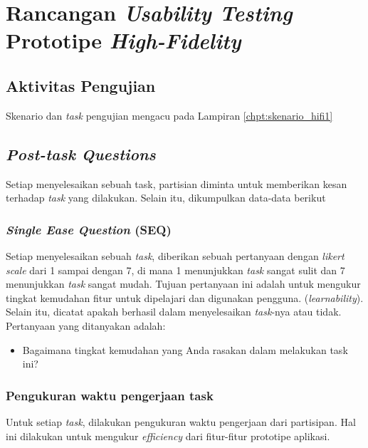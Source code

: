 \chapter{Rancangan \textit{Usability Testing} Prototipe \textit{High-Fidelity}}
\label{chpt:testing_hifi}

\newlength{\coln}
\setlength{\coln}{0.02\textwidth}

\newcommand{\apghead}[1]{\cellcolor[HTML]{A3E5F5}\textbf{#1}}
\newcommand{\apgheadcell}[1]{\multicolumn{1}{c|}{\apghead{#1}}}

\newcommand{\borderblue}{\arrayrulecolor[HTML]{A3E5F5}}
\newcommand{\borderblack}{\arrayrulecolor{black}}


\large \section{Aktivitas Pengujian}
\normalsize
Skenario dan \textit{task} pengujian mengacu pada Lampiran \ref{chpt:skenario_hifi1}

\large \section{\textit{Post-task Questions}}
\normalsize

Setiap menyelesaikan sebuah task, partisian diminta untuk memberikan kesan terhadap \textit{task} yang dilakukan. Selain itu, dikumpulkan data-data berikut

\subsection{\textit{Single Ease Question} (SEQ)}

Setiap menyelesaikan sebuah \textit{task}, diberikan sebuah pertanyaan dengan \textit{likert scale} dari 1 sampai dengan 7, di mana 1 menunjukkan \textit{task} sangat sulit dan 7 menunjukkan \textit{task} sangat mudah. Tujuan pertanyaan ini adalah untuk mengukur tingkat kemudahan fitur untuk dipelajari dan digunakan pengguna. (\textit{learnability}). Selain itu, dicatat apakah berhasil dalam menyelesaikan \textit{task}-nya atau tidak. Pertanyaan yang ditanyakan adalah:

\begin{itemize}
  \item Bagaimana tingkat kemudahan yang Anda rasakan dalam melakukan task ini?
\end{itemize}


\subsection{Pengukuran waktu pengerjaan task}
Untuk setiap \textit{task}, dilakukan pengukuran waktu pengerjaan dari partisipan. Hal ini dilakukan untuk mengukur \textit{efficiency} dari fitur-fitur prototipe aplikasi. 


